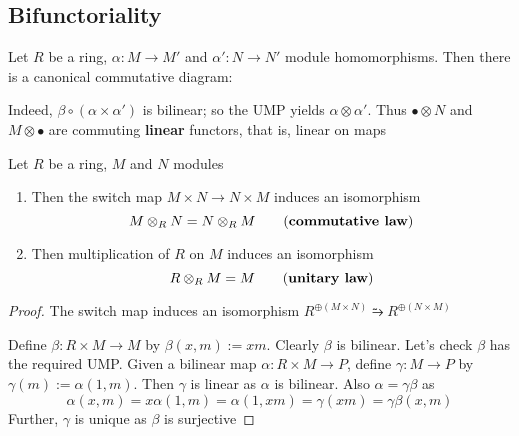 \documentclass[11pt]{article}
\begin{document}
\subsection*{Bifunctoriality}
\label{sec:org29fa76f}
Let \(R\) be a ring, \(\alpha:M\to M'\) and \(\alpha':N\to N'\) module
homomorphisms. Then there is a canonical commutative diagram:
\begin{center}\end{center}
Indeed, \(\beta\circ(\alpha\times\alpha')\) is bilinear; so the UMP yields
\(\alpha\otimes\alpha'\). Thus \(\bullet\otimes N\) and \(M\otimes\bullet\)
are commuting \textbf{linear} functors, that is, linear on maps

\begin{proposition}[]
\label{8.5}
Let \(R\) be a ring, \(M\) and \(N\) modules
\begin{enumerate}
\item Then the switch map \(M\times N\to N\times M\) induces an isomorphism
\begin{equation*}
M\otimes_R N=N\otimes_R M\tag*{(\textbf{commutative law})}
\end{equation*}
\item Then multiplication of \(R\) on \(M\) induces an isomorphism
\begin{equation*}
R\otimes_R M=M\tag*{(\textbf{unitary law})}
\end{equation*}
\end{enumerate}
\end{proposition}

\begin{proof}
The switch map induces an isomorphism \(R^{\oplus(M\times
   N)}\similarrightarrow R^{\oplus(N\times M)}\)

Define \(\beta:R\times M\to M\) by \(\beta(x,m):=xm\). Clearly \(\beta\) is bilinear. Let's
check \(\beta\) has the required UMP. Given a bilinear map \(\alpha: R\times M\to P\),
define \(\gamma:M\to P\) by \(\gamma(m):=\alpha(1,m)\). Then \(\gamma\) is linear as \(\alpha\) is
bilinear. Also \(\alpha=\gamma\beta\) as
\begin{equation*}
\alpha(x,m)=x\alpha(1,m)=\alpha(1,xm)=\gamma(xm)=\gamma\beta(x,m)
\end{equation*}
Further, \(\gamma\) is unique as \(\beta\) is surjective
\end{proof}
\end{document}
